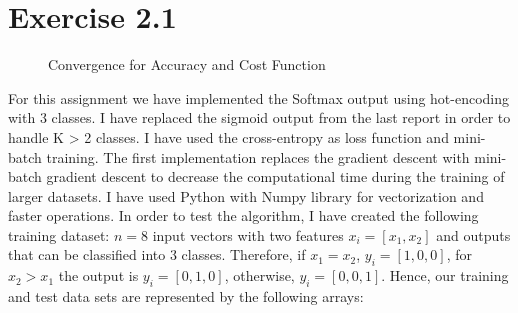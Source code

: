 \documentclass{article}
\begin{document}
\section{Exercise 2.1}
\begin{figure}[!tbp]
  \centering
  \hfill
  \caption{Convergence for Accuracy and Cost Function}
\end{figure}
For this assignment we have implemented the Softmax output using hot-encoding with 3 classes. I have replaced the sigmoid output from the last report in order to handle K > 2 classes. I have used the cross-entropy as loss function and mini-batch training. The first implementation replaces the gradient descent with mini-batch gradient descent to decrease the computational time during the training of larger datasets. I have used Python with Numpy library for vectorization and faster operations. In order to test the algorithm, I have created the following training dataset:  $n=8$ input vectors with two features $x_i=[x_1,x_2]$ and outputs that can be classified into 3 classes. Therefore, if $x_1=x_2$, $y_i = [1,0,0]$, for $x_2>x_1$ the output is $y_i = [0,1,0]$, otherwise, $y_i = [0,0,1]$. Hence, our training and test data sets are represented by the following arrays:
\end{document}
